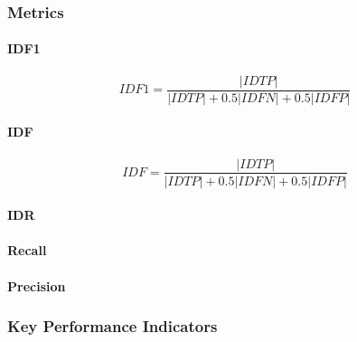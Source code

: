 \subsubsection{Metrics}
\paragraph{IDF1}

\begin{equation}
	IDF1 = \frac{|IDTP|}{|IDTP| + 0.5 |IDFN| + 0.5 |IDFP|}
\end{equation}

\paragraph{IDF}

\begin{equation}
	IDF = \frac{|IDTP|}{|IDTP| + 0.5 |IDFN| + 0.5 |IDFP|}
\end{equation}

\paragraph{IDR}

\paragraph{Recall}

\paragraph{Precision}

\subsubsection{Key Performance Indicators}
